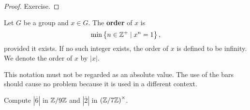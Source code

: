 \documentclass[11pt,a4paper]{article}
\begin{document}
\begin{proof}
    Exercise.
\end{proof}


\begin{defi}
    Let  $G$ be a group and $x \in G$.
    The \textbf{order} of $x$ is
    \[\min\left\{ n\in \mathbb{Z}^+ \mid x^n = 1 \right\},\]
    provided it exists. 
    If no such integer exists, the order of $x$ is defined to be infinity.
    We denote the order of \(x\) by $|x|$. 
\end{defi}


\begin{rem}
    This notation must not be regarded as an absolute value.
    The use of the bars  should cause no problem because it is used in a different context.
\end{rem}


\begin{eje}
    Compute \(|\overline{6}|\) in \( \mathbb{Z}/9\mathbb{Z} \) and \(|\overline{2}|\) in \(\left( \mathbb{Z}/7\mathbb{Z} \right)^\times\).
\end{eje}
\end{document}
